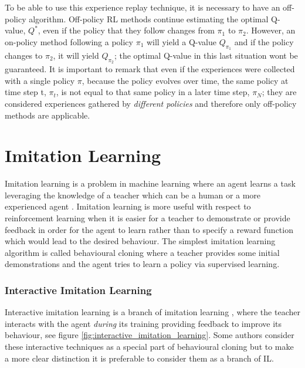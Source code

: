 

To be able to use this experience replay technique, it is necessary to have an off-policy algorithm. Off-policy RL methods continue estimating the optimal Q-value, $Q^*$, even if the policy that they follow changes from $\pi_1$ to $\pi_2$. However, an on-policy method following a policy $\pi_1$ will yield a Q-value $Q_{\pi_1}$ and if the policy changes to $\pi_2$, it will yield $Q_{\pi_2}$; the optimal Q-value in this last situation wont be guaranteed. It is important to remark that even if the experiences were collected with a single policy $\pi$, because the policy evolves over time, the same policy at time step t, $\pi_t$, is not equal to that same policy in a later time step, $\pi_N$; they are considered experiences gathered by \textit{different policies} and therefore only off-policy methods are applicable.













\section{Imitation Learning}
\label{section:Imitation Learning}

Imitation learning is a problem in machine learning where an agent learns a task leveraging the knowledge of a teacher which can be a human or a more experienced agent \cite{Imitation-Learning-definition-torabi:2019}. Imitation learning is more useful with respect to reinforcement learning when it is easier for a teacher to demonstrate or provide feedback in order for the agent to learn rather than to specify a reward function which would lead to the desired behaviour. The simplest imitation learning algorithm is called behavioural cloning where a teacher provides some initial demonstrations and the agent tries to learn a policy via supervised learning.


\subsubsection{Interactive Imitation Learning}
\label{subsubsection:Interactive-Imitation-Learning}

Interactive imitation learning is a branch of imitation learning \cite{lazydagger:2021}, where the teacher interacts with the agent \textit{during} its training providing feedback to improve its behaviour, see figure \ref{fig:interactive_imitation_learning}. Some authors \cite{Osa:2018} consider these interactive techniques as a special part of behavioural cloning but to make a more clear distinction it is preferable to consider them as a branch of IL.




